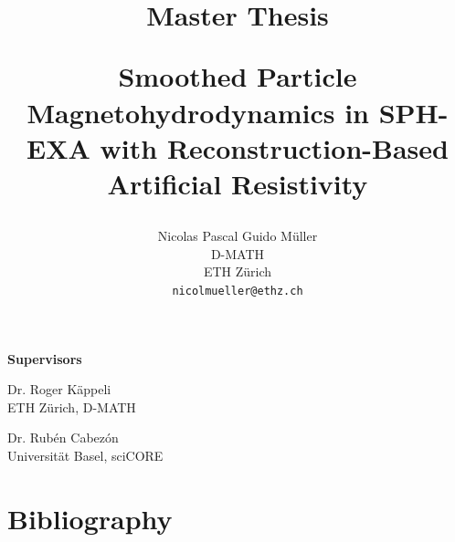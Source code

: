 \documentclass[]{article}
\title{%
  {\large Master Thesis\par}%
  \vspace{0.5em}
  Smoothed Particle Magnetohydrodynamics in SPH-EXA with Reconstruction-Based Artificial Resistivity
}
\author{
    Nicolas Pascal Guido Müller \vspace{0.3cm} \\
    D-MATH\\
    ETH Zürich\\
    \texttt{nicolmueller@ethz.ch} \\
}
\begin{document}

\vspace*{2cm}
\maketitle

\vspace*{\fill}
\begin{flushright}
{\textbf{Supervisors}\par}
{Dr. Roger K\"appeli \\ ETH Z\"urich, D-MATH\par}
{Dr. Rub\'en Cabez\'on \\ Universit\"at Basel, sciCORE\par}
\end{flushright}

% 
\newpage
{}
\setcounter{page}{1}
\listoftodos
\newpage
\vspace*{5cm}


\newpage
\setcounter{tocdepth}{2}
\tableofcontents
\vspace{2cm}


\clearpage
{}
\setcounter{page}{1}

\newpage

% 
\newpage

\newpage

\newpage


\newpage
{}
{}
\section*{Bibliography}
\printbibliography[heading=none]

%   
%   

\newpage
\appendix

\end{document}

